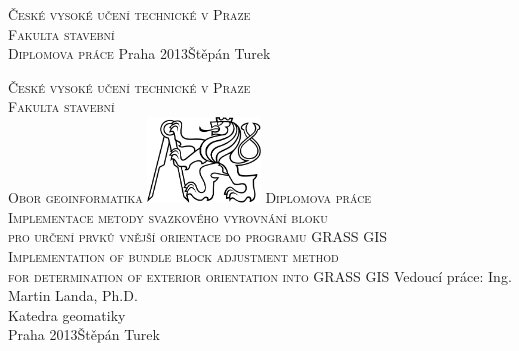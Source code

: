 \begin{center}



\newcommand{\napisCVUT}{České vysoké učení technické v Praze}
\newcommand{\napisFS}{Fakulta stavební}
\newcommand{\napisObor}{Obor geoinformatika}
\newcommand{\napisKatedra}{Katedra geomatiky}
\newcommand{\napisVedouci}{Ing. Martin Landa, Ph.D.}
\newcommand{\napisAutor}{Štěpán Turek}
\newcommand{\napisDatum}{Praha 2013}
\newcommand{\napisNazevI}{Implementace metody svazkového vyrovnání bloku}
\newcommand{\napisNazevII}{pro určení prvků vnější orientace do programu GRASS GIS}
\newcommand{\napisNazevAjI}{Implementation of bundle block adjustment method}
\newcommand{\napisNazevAjII}{for determination of exterior orientation into GRASS GIS}
\newcommand{\napisBakalarka}{Diplomova práce}
\newcommand{\napisPraha}{Praha 2013}


%
\newcommand{\velka}[1]{\textsc{#1}}
%
% 
\newif\ifpatitul
\patitultrue

\ifpatitul
{\Large\velka{\napisCVUT}}\\
\velka{\Large\napisFS}\\
\vfill
{\LARGE\velka{\napisBakalarka}}
\vfill
{\large\napisPraha\hfill\napisAutor}
\newpage
\fi%


{\Large\velka{\napisCVUT}}\\
{\Large\velka{\napisFS}}\\
{\Large\velka{\napisObor}}
\vfill
\includegraphics[width=3cm]{logo_cvut_cb} %
\vfill
{\Large\velka{\napisBakalarka}}\\
{\Large\velka{\napisNazevI\\
\napisNazevII}}\\
{\large\velka{\napisNazevAjI\\
\napisNazevAjII}}
\vfill
{\large%
Vedoucí práce: \napisVedouci\\
\napisKatedra\\
\bigskip
\napisDatum\hfill\napisAutor}
\end{center}

